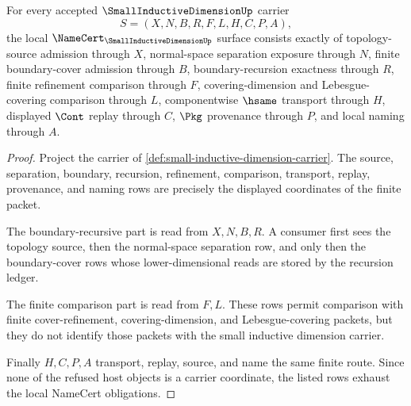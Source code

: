 \begin{theorem}
\label{thm:small-inductive-dimension-namecert-obligations}
For every accepted $\SmallInductiveDimensionUp$ carrier
$$
S=(X,N,B,R,F,L,H,C,P,A),
$$
the local $\NameCert_{\SmallInductiveDimensionUp}$ surface consists exactly of topology-source admission through $X$, normal-space separation exposure through $N$, finite boundary-cover admission through $B$, boundary-recursion exactness through $R$, finite refinement comparison through $F$, covering-dimension and Lebesgue-covering comparison through $L$, componentwise $\hsame$ transport through $H$, displayed $\Cont$ replay through $C$, $\Pkg$ provenance through $P$, and local naming through $A$.
\end{theorem}
\begin{proof}
Project the carrier of \autoref{def:small-inductive-dimension-carrier}. The source, separation, boundary, recursion, refinement, comparison, transport, replay, provenance, and naming rows are precisely the displayed coordinates of the finite packet.

The boundary-recursive part is read from $X,N,B,R$. A consumer first sees the topology source, then the normal-space separation row, and only then the boundary-cover rows whose lower-dimensional reads are stored by the recursion ledger.

The finite comparison part is read from $F,L$. These rows permit comparison with finite cover-refinement, covering-dimension, and Lebesgue-covering packets, but they do not identify those packets with the small inductive dimension carrier.

Finally $H,C,P,A$ transport, replay, source, and name the same finite route. Since none of the refused host objects is a carrier coordinate, the listed rows exhaust the local NameCert obligations.
\end{proof}

